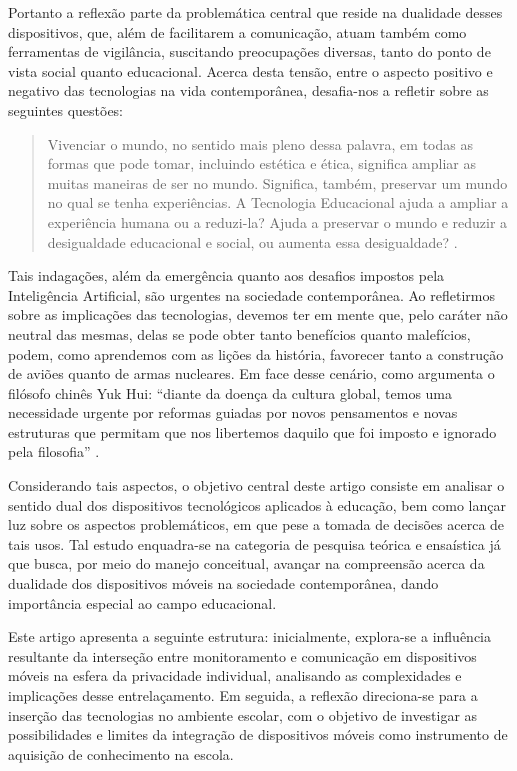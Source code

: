 \documentclass[portuguese]{textolivre}
\begin{document}
Portanto a reflexão parte da problemática central que reside na dualidade desses dispositivos, que, além de facilitarem a comunicação, atuam também como ferramentas de vigilância, suscitando preocupações diversas, tanto do ponto de vista social quanto educacional. Acerca desta tensão, entre o aspecto positivo e negativo das tecnologias na vida contemporânea, \textcite{bannell_uma_2017} desafia-nos a refletir sobre as seguintes questões:

\begin{quote}
    Vivenciar o mundo, no sentido mais pleno dessa palavra, em todas as formas que pode tomar, incluindo estética e ética, significa ampliar as muitas maneiras de ser no mundo. Significa, também, preservar um mundo no qual se tenha experiências. A Tecnologia Educacional ajuda a ampliar a experiência humana ou a reduzi-la? Ajuda a preservar o mundo e reduzir a desigualdade educacional e social, ou aumenta essa desigualdade? \cite[p. 49]{bannell_uma_2017}.
\end{quote}


Tais indagações, além da emergência quanto aos desafios impostos pela Inteligência Artificial, são urgentes na sociedade contemporânea. Ao refletirmos sobre as implicações das tecnologias, devemos ter em mente que, pelo caráter não neutral das mesmas, delas se pode obter tanto benefícios quanto malefícios, podem, como aprendemos com as lições da história, favorecer tanto a construção de aviões quanto de armas nucleares. Em face desse cenário, como argumenta o filósofo chinês Yuk Hui: “diante da doença da cultura global, temos uma necessidade urgente por reformas guiadas por novos pensamentos e novas estruturas que permitam que nos libertemos daquilo que foi imposto e ignorado pela filosofia” \cite[p. 212]{hui_tecnodiversidade_2020}.

Considerando tais aspectos, o objetivo central deste artigo consiste em analisar o sentido dual dos dispositivos tecnológicos aplicados à educação, bem como lançar luz sobre os aspectos problemáticos, em que pese a tomada de decisões acerca de tais usos. Tal estudo enquadra-se na categoria de pesquisa teórica e ensaística já que busca, por meio do manejo conceitual, avançar na compreensão acerca da dualidade dos dispositivos móveis na sociedade contemporânea, dando importância especial ao campo educacional.

Este artigo apresenta a seguinte estrutura: inicialmente, explora-se a influência resultante da interseção entre monitoramento e comunicação em dispositivos móveis na esfera da privacidade individual, analisando as complexidades e implicações desse entrelaçamento. Em seguida, a reflexão direciona-se para a inserção das tecnologias no ambiente escolar, com o objetivo de investigar as possibilidades e limites da integração de dispositivos móveis como instrumento de aquisição de conhecimento na escola. 
\end{document}
